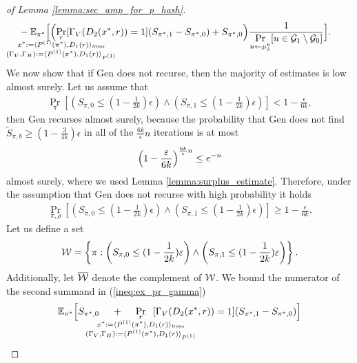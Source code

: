 \begin{proof}[of Lemma \ref{lemma:sec_amp_for_p_hash}]
\begin{align}
&- \mathbb{E}_{\pi^*}\Bigl[\Bigl(
\underset{\mathclap{
  \substack{r \\ x^* := \langle P^{(1)}(\pi^*), D_1(r) \rangle_{\mathit{trans}} \\ (\Gamma_V, \Gamma_H) := \langle P^{(1)}(\pi^*), D_1(r) \rangle_{P^{(1)}} }}}
{\Pr}[\Gamma_V(D_2(x^*, r)) = 1](S_{\pi^*,1} - S_{\pi^*,0})
 + S_{\pi^*,0}\Bigr)
\frac{1}{\underset{u \leftarrow \mu_{\delta}^k}{\Pr}[ u \in \cG_1 \setminus\cG_0]}\Bigr].
\end{align}
We now show that if Gen does not recurse, then the majority of estimates is low almost surely.
Let us assume that
\begin{align}
\underset{\pi}{\Pr}\left[\left(S_{\pi,0} \leq (1 - \frac{1}{2k})\epsilon\right) \land \left( S_{\pi,1} \leq (1-\frac{1}{2k})\epsilon\right)\right] < 1 - \frac{\epsilon}{6k},
\end{align}
then Gen recurses almost surely, because the probability that
Gen does not find $\widetilde{S}_{\pi, b} \geq (1-\frac{3}{4k})\epsilon$ in all of the $\frac{6k}{\epsilon}n$ iterations is at most
\begin{align*}
  \Bigl(1 - \frac{\epsilon}{6k}\Bigr)^{\frac{6k}{\epsilon}n} \leq e^{-n}
\end{align*}
almost surely, where we used Lemma \ref{lemma:surplus_estimate}.
Therefore, under the assumption that Gen does not recurse with high probability it holds
\begin{align}
\underset{\pi, \rho}{\Pr}\left[\left(S_{\pi,0} \leq (1 - \frac{1}{2k})\epsilon\right) \land \left( S_{\pi,1} \leq (1-\frac{1}{2k})\epsilon\right)\right] \geq 1 - \frac{\epsilon}{6k}.
\end{align}
Let us define a set
\begin{align}
  \cW = \left\{ \pi :  \left(S_{\pi,0} \leq (1 - \frac{1}{2k})\epsilon\right) \land \left( S_{\pi,1} \leq (1-\frac{1}{2k})\epsilon \right) \right\}.
\end{align}
Additionally, let $\overline{\cW}$ denote the complement of $\cW$.
We bound the numerator of the second summand in (\ref{ineq:ex_pr_gamma})
\begin{align}
  \label{ineq:second_eq}
&\mathbb{E}_{\pi^*}\Big[ S_{\pi^*,0}
\mkern23mu
+
\mkern23mu
\underset{
  \mathclap{
  \substack{r \\ x^* := \langle P^{(1)}(\pi^*), D_1(r) \rangle_{\mathit{trans}}
    \\ (\Gamma_V, \Gamma_H) := \langle P^{(1)}(\pi^*), D_1 (r) \rangle_{P^{(1)}} }}}
{\Pr}\mkern13mu[\Gamma_V(D_2(x^*, r)) = 1]
(S_{\pi^*,1} - S_{\pi^*,0})\Big] \notag\\

\end{align}
\end{proof}
